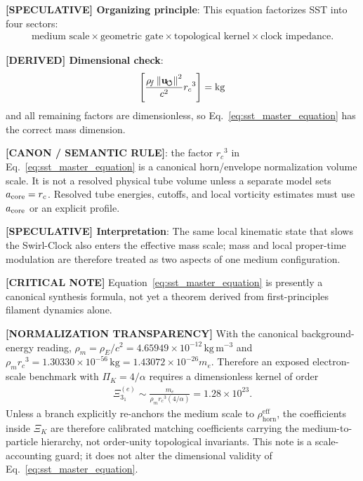 \documentclass[11pt]{article}
\theoremstyle{definition}
\theoremstyle{plain}
\theoremstyle{remark}
\newcommand{\rhoF}{{\rho_{\!f}}}
\newcommand{\rhoE}{\rho_{\!E}}
\newcommand{\rhoM}{\rho_{\!m}}
\newcommand{\rhohorn}{\rho_{\mathrm{horn}}^{\mathrm{eff}}}
\newcommand{\rc}{{r_c}}
\newcommand{\uswirl}{\mathbf{u}_{\!\boldsymbol{\circlearrowleft}}}
\begin{document}
        \textbf{[SPECULATIVE] Organizing principle}: This equation factorizes SST into four sectors:
        \begin{align}
            \text{medium scale} \times \text{geometric gate} \times \text{topological kernel} \times \text{clock impedance} .
        \end{align}

        \textbf{[DERIVED] Dimensional check}:
        \begin{align}
            \left[ \frac{\rhoF\,\norm{\uswirl}^2}{c^2} \rc^3 \right] = \mathrm{kg}
        \end{align}
        and all remaining factors are dimensionless, so Eq.~\ref{eq:sst_master_equation} has the correct mass dimension.

        \textbf{[CANON / SEMANTIC RULE]}: the factor \(\rc^3\) in Eq.~\eqref{eq:sst_master_equation} is a canonical horn/envelope normalization volume scale. It is not a resolved physical tube volume unless a separate model sets \(a_{\rm core}=\rc\). Resolved tube energies, cutoffs, and local vorticity estimates must use \(a_{\rm core}\) or an explicit profile.

        \textbf{[SPECULATIVE] Interpretation}: The same local kinematic state that slows the Swirl-Clock also enters the effective mass scale; mass and local proper-time modulation are therefore treated as two aspects of one medium configuration.

        \textbf{[CRITICAL NOTE]} Equation~\eqref{eq:sst_master_equation} is presently a canonical synthesis formula, not yet a theorem derived from first-principles filament dynamics alone.

        \textbf{[NORMALIZATION TRANSPARENCY]} With the canonical background-energy reading, $\rhoM=\rhoE/c^2=4.65949\times10^{-12}\,\mathrm{kg\,m^{-3}}$ and $\rhoM\rc^3=1.30330\times10^{-56}\,\mathrm{kg}=1.43072\times10^{-26}m_e$. Therefore an exposed electron-scale benchmark with $\Pi_K=4/\alpha$ requires a dimensionless kernel of order
        \begin{align}
            \Xi_{3_1}^{(e)}
            \sim
            \frac{m_e}{\rhoM\rc^3(4/\alpha)}
            =
            1.28\times10^{23}.
            \label{eq:kernel_normalization_scale_guard}
        \end{align}
        Unless a branch explicitly re-anchors the medium scale to $\rhohorn$, the coefficients inside $\Xi_K$ are therefore calibrated matching coefficients carrying the medium-to-particle hierarchy, not order-unity topological invariants. This note is a scale-accounting guard; it does not alter the dimensional validity of Eq.~\eqref{eq:sst_master_equation}.
\end{document}
